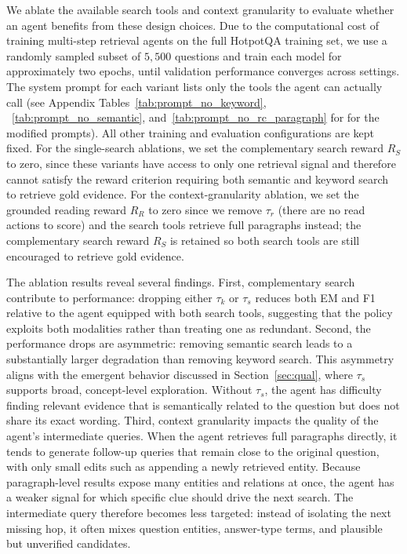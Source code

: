\documentclass[11pt]{article}
\begin{document}
We ablate the available search tools and context granularity to evaluate whether an agent benefits from these design choices. Due to the computational cost of training multi-step retrieval agents on the full HotpotQA training set, we use a randomly sampled subset of $5{,}500$ questions and train each model for approximately two epochs, until validation performance converges across settings. The system prompt for each variant lists only the tools the agent can actually call (see Appendix Tables~\ref{tab:prompt_no_keyword}, ~\ref{tab:prompt_no_semantic}, and~\ref{tab:prompt_no_rc_paragraph} for  for the modified prompts). All other training and evaluation configurations are kept fixed. For the single-search ablations, we set the complementary search reward $R_S$ to zero, since these variants have access to only one retrieval signal and therefore cannot satisfy the reward criterion requiring both semantic and keyword search to retrieve gold evidence. For the context-granularity ablation, we set the grounded reading reward $R_R$ to zero since we remove $\tau_r$ (there are no read actions to score) and the search tools retrieve full paragraphs instead; the complementary search reward $R_S$ is retained so both search tools are still encouraged to retrieve gold evidence.


The ablation results reveal several findings. First, complementary search  contribute to performance: dropping either $\tau_k$ or $\tau_s$ reduces both EM and F1 relative to the agent equipped with both search tools, suggesting that the policy exploits both modalities rather than treating one as redundant. Second, the performance drops are asymmetric: removing semantic search leads to a substantially larger degradation than removing keyword search. 
%
This asymmetry aligns with the emergent behavior discussed in Section~\ref{sec:qual}, where $\tau_s$ supports broad, concept-level exploration. Without $\tau_s$, the agent has difficulty finding relevant evidence that is semantically related to the question but does not share its exact wording.
%
Third, context granularity impacts the quality of the agent’s intermediate queries. When the agent retrieves full paragraphs directly, it tends to generate follow-up queries that remain close to the original question, with only small edits such as appending a newly retrieved entity. Because paragraph-level results expose many entities and relations at once, the agent has a weaker signal for which specific clue should drive the next search. The intermediate query therefore becomes less targeted: instead of isolating the next missing hop, it often mixes question entities, answer-type terms, and plausible but unverified candidates. 
\end{document}
